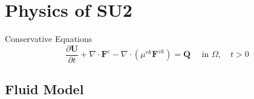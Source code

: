 \section{Physics of SU2}

\begin{frame}{Conservative Equations}
\begin{equation}
\frac{\partial \boldsymbol{U}}{\partial t}+\nabla \cdot \boldsymbol{F}^{c}-\nabla \cdot\left(\mu^{v k} \boldsymbol{F}^{v k}\right)=\boldsymbol{Q} \quad \text { in }\Omega,  \quad t>0
\end{equation}
    
\end{frame}

\subsection{Fluid Model}
